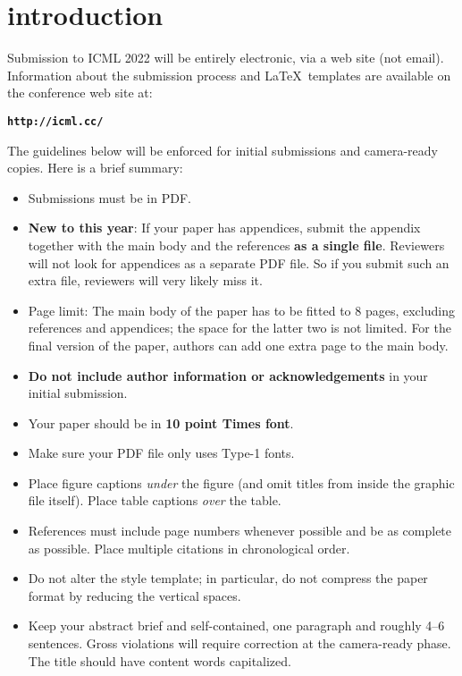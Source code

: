 \section{introduction}
\label{submission}

Submission to ICML 2022 will be entirely electronic, via a web site
(not email). Information about the submission process and \LaTeX\ templates
are available on the conference web site at:
\begin{center}
\textbf{\texttt{http://icml.cc/}}
\end{center}

The guidelines below will be enforced for initial submissions and
camera-ready copies. Here is a brief summary:
\begin{itemize}
\item Submissions must be in PDF\@. 
\item \textbf{New to this year}: If your paper has appendices, submit the appendix together with the main body and the references \textbf{as a single file}. Reviewers will not look for appendices as a separate PDF file. So if you submit such an extra file, reviewers will very likely miss it.
\item Page limit: The main body of the paper has to be fitted to 8 pages, excluding references and appendices; the space for the latter two is not limited. For the final version of the paper, authors can add one extra page to the main body.
\item \textbf{Do not include author information or acknowledgements} in your
    initial submission.
\item Your paper should be in \textbf{10 point Times font}.
\item Make sure your PDF file only uses Type-1 fonts.
\item Place figure captions \emph{under} the figure (and omit titles from inside
    the graphic file itself). Place table captions \emph{over} the table.
\item References must include page numbers whenever possible and be as complete
    as possible. Place multiple citations in chronological order.
\item Do not alter the style template; in particular, do not compress the paper
    format by reducing the vertical spaces.
\item Keep your abstract brief and self-contained, one paragraph and roughly
    4--6 sentences. Gross violations will require correction at the
    camera-ready phase. The title should have content words capitalized.
\end{itemize}

